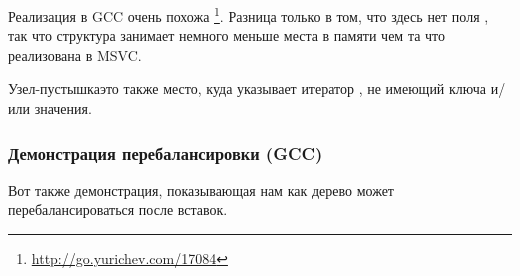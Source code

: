 



Реализация в GCC очень похожа
\footnote{\url{http://go.yurichev.com/17084}}.
Разница только в том, что здесь нет поля ,
так что структура занимает немного меньше места в памяти чем та что реализована в MSVC.

Узел-пустышка\EMDASH{}это также место, куда указывает итератор , не имеющий ключа и/или значения.

\subsubsection{Демонстрация перебалансировки (GCC)}

Вот также демонстрация, показывающая нам как дерево может перебалансироваться после вставок.





